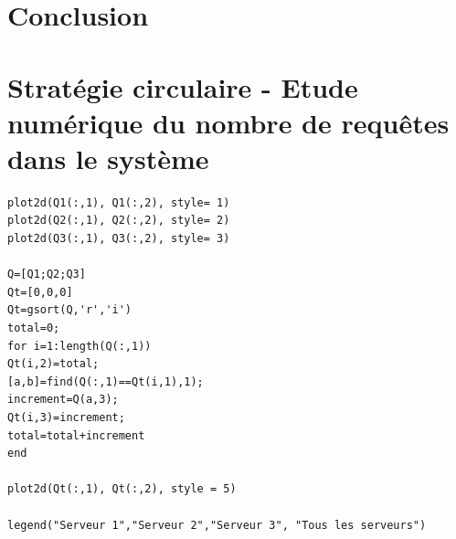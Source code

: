 \documentclass{article}
\begin{document}
\section{Conclusion}
\paragraph{}

\newpage
\appendix

\section{Stratégie circulaire - Etude numérique du nombre de requêtes dans le système}\label{tls}
%
\begin{verbatim}
plot2d(Q1(:,1), Q1(:,2), style= 1)
plot2d(Q2(:,1), Q2(:,2), style= 2)
plot2d(Q3(:,1), Q3(:,2), style= 3)

Q=[Q1;Q2;Q3]
Qt=[0,0,0]
Qt=gsort(Q,'r','i')
total=0;
for i=1:length(Q(:,1))
Qt(i,2)=total;
[a,b]=find(Q(:,1)==Qt(i,1),1);
increment=Q(a,3);
Qt(i,3)=increment;
total=total+increment
end

plot2d(Qt(:,1), Qt(:,2), style = 5)

legend("Serveur 1","Serveur 2","Serveur 3", "Tous les serveurs")
\end{verbatim}
%
\end{document}
